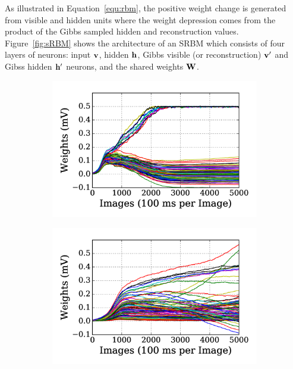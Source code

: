 As illustrated in Equation~\ref{equ:rbm}, the positive weight change is generated from \DIFdelbegin {}\DIFdelend \DIFaddbegin {}\DIFaddend visible and hidden units where the weight depression comes from the product of the Gibbs sampled hidden and reconstruction values.
Figure~\ref{fig:sRBM} shows the architecture of an SRBM which consists of four layers of neurons: input $\bf{v}$, hidden \DIFaddbegin {}\DIFaddend $\bf{h}$, Gibbs visible (or reconstruction) $\bf{v'}$ and Gibss hidden $\bf{h'}$ neurons, and the shared weights $\bf{W}$.

\DIFaddbegin \begin{figure}
	\centering
	\begin{subfigure}[t]{0.48\textwidth}
		\includegraphics[width=\textwidth]{pics_sdlm/10_exp_SRBM_Orig/exp1_weights_s.png}
		\caption{}
	\end{subfigure}
	\begin{subfigure}[t]{0.48\textwidth}
		\includegraphics[width=\textwidth]{pics_sdlm/10_exp_SRBM_Orig/exp2_weights_s.png}

\end{subfigure}
\end{figure}
